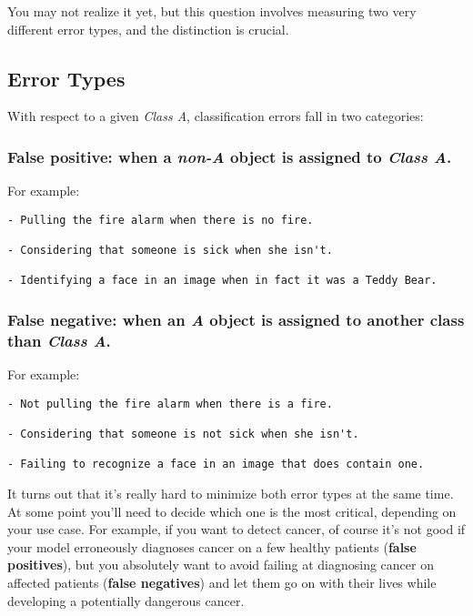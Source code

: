 \documentclass[]{article}
\begin{document}
You may not realize it yet, but this question involves measuring two
very different error types, and the distinction is crucial.

\hypertarget{error-types}{%
\subsection{Error Types}\label{error-types}}

With respect to a given \emph{Class A}, classification errors fall in
two categories:

\hypertarget{false-positive-when-a-non-a-object-is-assigned-to-class-a.}{%
\subsubsection{\texorpdfstring{\textbf{False positive:} when a
\emph{non-A} object is assigned to \emph{Class
A}.}{False positive: when a non-A object is assigned to Class A.}}\label{false-positive-when-a-non-a-object-is-assigned-to-class-a.}}

For example:

\begin{verbatim}
- Pulling the fire alarm when there is no fire.

- Considering that someone is sick when she isn't.

- Identifying a face in an image when in fact it was a Teddy Bear.
\end{verbatim}

\hypertarget{false-negative-when-an-a-object-is-assigned-to-another-class-than-class-a.}{%
\subsubsection{\texorpdfstring{\textbf{False negative:} when an \emph{A}
object is assigned to another class than \emph{Class
A}.}{False negative: when an A object is assigned to another class than Class A.}}\label{false-negative-when-an-a-object-is-assigned-to-another-class-than-class-a.}}

For example:

\begin{verbatim}
- Not pulling the fire alarm when there is a fire.

- Considering that someone is not sick when she isn't.

- Failing to recognize a face in an image that does contain one.
\end{verbatim}

It turns out that it's really hard to minimize both error types at the
same time. At some point you'll need to decide which one is the most
critical, depending on your use case. For example, if you want to detect
cancer, of course it's not good if your model erroneously diagnoses
cancer on a few healthy patients (\textbf{false positives}), but you
absolutely want to avoid failing at diagnosing cancer on affected
patients (\textbf{false negatives}) and let them go on with their lives
while developing a potentially dangerous cancer.
\end{document}
